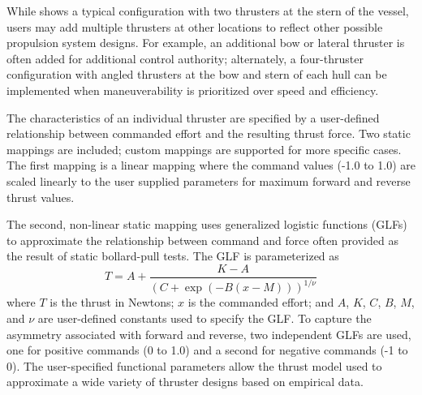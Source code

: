 \documentclass[utf8]{frontiersSCNS} %
\begin{document}
While  shows a typical configuration with two thrusters at the stern of the vessel, users may add multiple thrusters at other locations to reflect other possible propulsion system designs.  For example, an additional bow or lateral thruster is often added for additional control authority; alternately, a four-thruster configuration with angled thrusters at the bow and stern of each hull can be implemented when maneuverability is prioritized over speed and efficiency.  

The characteristics of an individual thruster are specified by a user-defined relationship between commanded effort and the resulting thrust force.  Two static mappings are included; custom mappings are supported for more specific cases.  The first mapping is a linear mapping where the command values (-1.0 to 1.0) are scaled linearly to the user supplied parameters for maximum forward and reverse thrust values.  

The second, non-linear static mapping uses generalized logistic functions (GLFs) to approximate the relationship between command and force often provided as the result of static bollard-pull tests.  The GLF is parameterized as 
\begin{equation}
  T = A + \frac{K-A}{\left(C+\exp(-B(x-M))\right)^{1/\nu}}
  \label{e:glf}
\end{equation}
where $T$ is the thrust in Newtons; $x$ is the commanded effort; and $A$, $K$, $C$, $B$, $M$, and $\nu$ are user-defined constants used to specify the GLF. To capture the asymmetry associated with forward and reverse, two independent GLFs are used, one for positive commands (0 to 1.0) and a second for negative commands (-1 to 0).  The user-specified functional parameters allow the thrust model used to approximate a wide variety of thruster designs based on empirical data.
\end{document}
